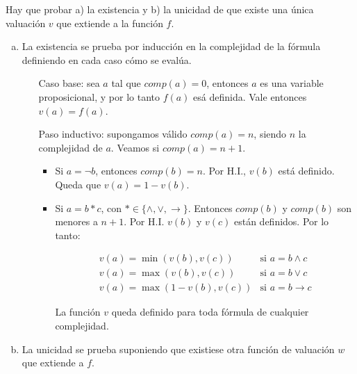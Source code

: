 \begin{questions}

\begin{solution}
 

Hay que probar a) la existencia y b) la unicidad de que existe una \'unica valuaci\'on $v$ que extiende a la funci\'on $f$. 

\begin{enumerate}[a)]
 \item La existencia se prueba por inducci\'on en la complejidad de la f\'ormula definiendo en cada caso c\'omo se eval\'ua. 
  
  \begin{enumerate}[\quad]
  \item[Caso base:] sea $a$ tal que $comp(a) = 0$, entonces $a$ es una variable proposicional, y por lo tanto $f(a)$ es\'a definida. Vale entonces $v(a) = f(a)$. 
  
  \item[Paso inductivo:] supongamos v\'alido $comp(a) = n$, siendo $n$ la complejidad de $a$. Veamos si $comp(a) = n+1$. 
    
    \begin{itemize}
      \item Si $a=\neg b$, entonces $comp(b) = n$. Por H.I., $v(b)$ est\'a definido. Queda que $v(a) = 1 - v(b)$. 
      
      \item Si $a=b*c$, con $* \in \{\wedge, \vee, \rightarrow \}$. Entonces $comp(b)$ y $comp(b)$ son menores a $n+1$. Por H.I. $v(b)$ y $v(c)$ est\'an definidos. Por lo tanto: 
      
      \begin{eqnarray*}
      v(a) = \min(v(b), v(c)) & \text{si } a = b \wedge c\\
      v(a) = \max(v(b), v(c)) & \text{si } a = b \vee c \\
      v(a) = \max(1-v(b), v(c)) & \text{si } a = b \rightarrow c
      \end{eqnarray*}
      
      La funci\'on $v$ queda definido para toda f\'ormula de cualquier complejidad.
    \end{itemize}
  \end{enumerate}
 \item La unicidad se prueba suponiendo que existiese otra funci\'on de valuaci\'on $w$ que extiende a $f$. 
 

\end{enumerate}
\end{solution}
\end{questions}
